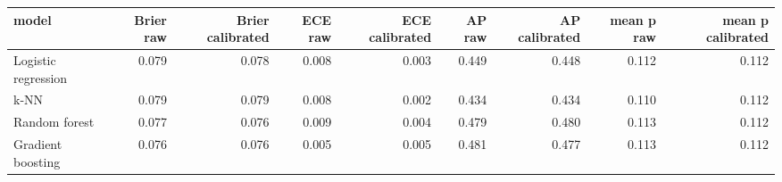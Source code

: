 \begin{tabular}{lrrrrrrrr}
\toprule
model & Brier raw & Brier calibrated & ECE raw & ECE calibrated & AP raw & AP calibrated & mean p raw & mean p calibrated \\
\midrule
Logistic regression & 0.079 & 0.078 & 0.008 & 0.003 & 0.449 & 0.448 & 0.112 & 0.112 \\
k-NN & 0.079 & 0.079 & 0.008 & 0.002 & 0.434 & 0.434 & 0.110 & 0.112 \\
Random forest & 0.077 & 0.076 & 0.009 & 0.004 & 0.479 & 0.480 & 0.113 & 0.112 \\
Gradient boosting & 0.076 & 0.076 & 0.005 & 0.005 & 0.481 & 0.477 & 0.113 & 0.112 \\
\bottomrule
\end{tabular}